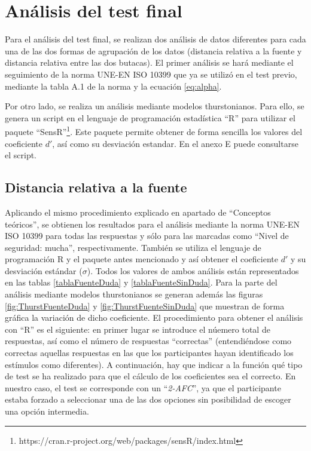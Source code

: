 \documentclass[11pt,a4paper]{book}
\begin{document}
    \section{Análisis del test final}
        Para el análisis del test final, se realizan dos análisis de datos diferentes para cada una de las dos formas de agrupación de los datos (distancia relativa a la fuente y distancia relativa entre las dos  butacas). El primer análisis se hará mediante el seguimiento de la norma UNE-EN ISO 10399 que ya se utilizó en el test previo, mediante la tabla A.1 de la norma y la ecuación \ref{eq:alpha}.
        
        Por otro lado, se realiza un análisis mediante modelos thurstonianos. Para ello, se genera un script en el lenguaje de programación estadística ``R'' para utilizar el paquete ``SensR''\footnote{https://cran.r-project.org/web/packages/sensR/index.html}. Este paquete permite obtener de forma sencilla los valores del coeficiente $d'$, así como su desviación estandar. En el anexo E puede consultarse el script.
        
        
		\subsection{Distancia relativa a la fuente}
		    Aplicando el mismo procedimiento explicado en apartado de ``Conceptos teóricos'', se obtienen los resultados para el análisis mediante la norma UNE-EN ISO 10399 para todas las respuestas y sólo para las marcadas como ``Nivel de seguridad: mucha'', respectivamente. También se utiliza el lenguaje de programación R y el paquete antes mencionado y así obtener el coeficiente $d'$ y su desviación estándar ($\sigma$). Todos los valores de ambos análisis están representados en las tablas \ref{tablaFuenteDuda} y \ref{tablaFuenteSinDuda}. Para la parte del análisis mediante modelos thurstonianos se generan además las figuras \ref{fig:ThurstFuenteDuda} y \ref{fig:ThurstFuenteSinDuda} que muestran de forma gráfica la variación de dicho coeficiente. El procedimiento para obtener el análisis con ``R'' es el siguiente: en primer lugar se introduce el núemero total de respuestas, así como el número de respuestas ``correctas'' (entendiéndose como correctas aquellas respuestas en las que los participantes hayan identificado los estímulos como diferentes). A continuación, hay que indicar a la función qué tipo de test se ha realizado para que el cálculo de los coeficientes sea el correcto. En nuestro caso, el test se corresponde con un ``\textit{2-AFC}'', ya que el participante estaba forzado a seleccionar una de las dos opciones sin posibilidad de escoger una opción intermedia.
		    
\end{document}
